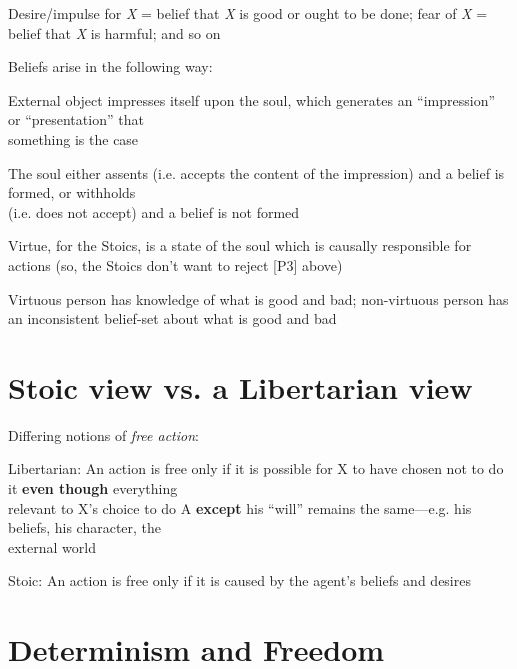 \documentclass[11pt]{article}
\begin{document}
\noindent Desire/impulse for \emph{X} = belief that \emph{X} is good or ought to be done; fear of \emph{X} = belief that \emph{X} is harmful; and so on
\vspace*{2mm}

\noindent Beliefs arise in the following way: 
\vspace*{2mm}

External object impresses itself upon the soul, which generates an ``impression'' or ``presentation'' that\\\hspace*{6mm}something is the case
\vspace*{1mm}

The soul either assents (i.e. accepts the content of the impression) and a belief is formed, or withholds\\\hspace*{6mm}(i.e. does not accept) and a belief is not formed
\vspace*{2mm}

\noindent Virtue, for the Stoics, is a state of the soul which is causally responsible for actions (so, the Stoics don't want to reject [P3] above)
\vspace*{2mm}

\noindent Virtuous person has knowledge of what is good and bad; non-virtuous person has an inconsistent belief-set about what is good and bad

\section*{Stoic view vs. a Libertarian view}

\noindent Differing notions of \emph{free action}:
\vspace*{2mm}

Libertarian: An action is free only if it is possible for X to have chosen not to do it \textbf{even though} everything\\\hspace*{6mm}relevant to X's choice to do A \textbf{except} his ``will'' remains the same---e.g. his beliefs, his character, the\\\hspace*{6mm}external world
\vspace*{2mm}

Stoic: An action is free only if it is caused by the agent's beliefs and desires

\section*{Determinism and Freedom}
\end{document}
